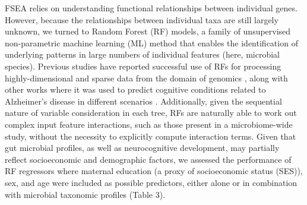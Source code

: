 \documentclass{article}
\begin{document}
FSEA relies on understanding functional relationships between individual
genes. However, because the relationships between individual taxa are
still largely unknown, we turned to Random Forest (RF) models, a family of 
unsupervised non-parametric machine learning (ML) method that enables
the identification of underlying patterns in large numbers of individual
features (here, microbial species). Previous studies have reported
successful use of RFs for processing highly-dimensional and sparse data
from the domain of genomics
\cite{amaratungaEnrichedRandomForests2008,brieucPracticalIntroductionRandom2018,chenRandomForestsGenomic2012,franzosaGutMicrobiomeStructure2019,stephanRandomForestApproach2015},
along with other works where it was used
to predict cognitive conditions related to Alzheimer's disease in
different scenarios \cite{ardekaniPredictionIncipientAlzheimer2017,velazquezRandomForestModel2021}.
Additionally, given the sequential
nature of variable consideration in each tree, RFs are naturally able to
work out complex input feature interactions, such as those present in a
microbiome-wide study, without the necessity to explicitly compute
interaction terms. Given that gut microbial profiles, as well as neurocognitive
development, may partially reflect socioeconomic and demographic
factors, we assessed the performance of RF regressors where maternal
education (a proxy of socioeconomic status (SES)), sex, and age were
included as possible predictors, either alone or in combination with
microbial taxonomic profiles (Table 3).
\end{document}
